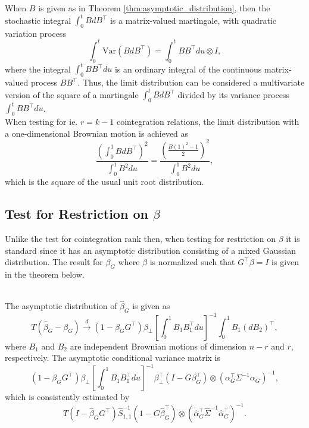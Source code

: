 \noindent When $B$ is given as in Theorem \ref{thm:asymptotic_distribution}, then the stochastic integral $\int_0^t BdB^\top$ is a matrix-valued martingale, with quadratic variation process
\begin{equation*}
    \int_0^t \text{Var}(BdB^\top) =\int_0^t BB^\top du \otimes I,
\end{equation*}
\noindent where the integral $\int_0^t BB^\top du$ is an ordinary integral of the continuous matrix-valued process $BB^\top$. Thus, the limit distribution can be considered a multivariate version of the square of a martingale $\int_0^t BdB^\top$ divided by its variance process $\int_0^t BB^\top du$.\\
When testing for ie. $r=k-1$ cointegration relations, the limit distribution with a one-dimensional Brownian motion is achieved as
\begin{equation*}
   \frac{\left(\int_0^1 BdB^\top \right)^2}{\int_0^1 B^2du}=\frac{\left(\frac{B(1)^2-1}{2} \right)^2}{\int_0^1 B^2du},
\end{equation*}
which is the square of the usual unit root distribution.

\subsection{Test for Restriction on $\beta$}
Unlike the test for cointegration rank then, when testing for restriction on $\beta$ it is standard since it has an asymptotic distribution consisting of a mixed Gaussian distribution. The result for $\beta_G$ where $\beta$ is normalized such that $G^\top \beta=I$ is given in the theorem below.
\begin{thm}\phantom\\
The asymptotic distribution of $\hat{\beta}_G$ is given as 
\begin{equation}
    T(\hat{\beta}
_G-\beta_G) \overset{d}{\rightarrow} (1-\beta_G G^\top) \beta_\perp \left[ \int_0^1 B_1 B_1^\top du \right]^{-1} \int_0^1 B_1(dB_2)^\top,
    \label{eq:asymptotic_Beta_1}
\end{equation}
    where $B_1$ and $B_2$ are independent Brownian motions of dimension $n-r$ and $r$, respectively. The asymptotic conditional variance matrix is 
    \begin{equation}
        (1-\beta_G G^\top) \beta_\perp \left[\int_0^1 B_1B_1^\top du \right]^{-1} \beta_\perp^\top (I-G\beta_G^\top ) \otimes (\alpha_G^\top \Sigma^{-1}\alpha_G)^{-1},
        \label{eq:asymptotic_Beta_2}
    \end{equation}
    which is consistently estimated by
    \begin{equation}
        T(I-\hat{\beta}_G G^\top)\hat{S}_{1,1}^{-1}(1-G\hat{\beta}_G^\top) \otimes (\hat{\alpha}_G^\top \hat{\Sigma}^{-1}\hat{\alpha}_G^\top)^{-1}.
        \label{eq:asymptotic_Beta_3}
    \end{equation}
\end{thm}

